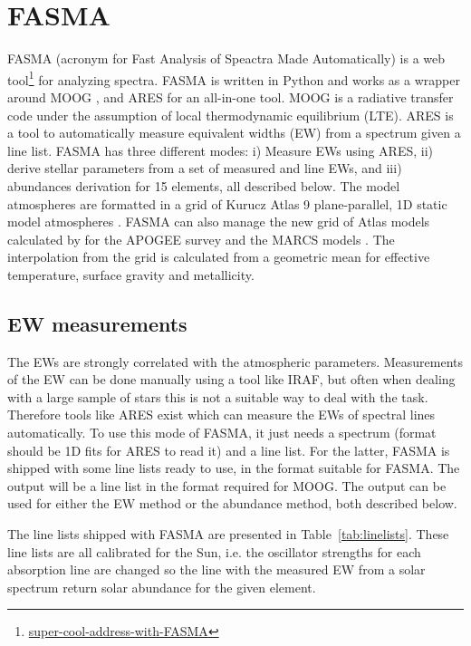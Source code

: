 \documentclass{aa}
\begin{document}
\section{FASMA}
\label{sec:FASMA}
FASMA (acronym for Fast Analysis of Speactra Made Automatically) is a web
tool\footnote{\url{super-cool-address-with-FASMA}} for analyzing spectra. FASMA
is written in Python and works as a wrapper around MOOG
\citep[][version 2014]{Sneden1973}, and ARES \citep{Sousa2015a} for an all-in-one
tool. MOOG is a radiative transfer code under the assumption of local
thermodynamic equilibrium (LTE). ARES is a tool to automatically measure
equivalent widths (EW) from a spectrum given a line list. FASMA has three
different modes: i) Measure EWs using ARES, ii) derive stellar parameters from a
set of measured  and  line EWs, and iii) abundances
derivation for 15 elements, all described below. The model atmospheres are
formatted in a grid of Kurucz Atlas 9 plane-parallel, 1D static model
atmospheres \citet{Kurucz1993}. FASMA can also manage the new grid of Atlas
models calculated by \citet{Meszaros2012} for the APOGEE survey and the MARCS
models \citep{Gustafson2008}. The interpolation from the grid is calculated from
a geometric mean for effective temperature, surface gravity and metallicity.



\subsection{EW measurements}
\label{sub:EW_measurements}
The EWs are strongly correlated with the atmospheric parameters. Measurements of
the EW can be done manually using a tool like IRAF, but often when dealing with
a large sample of stars this is not a suitable way to deal with the task.
Therefore tools like ARES exist which can measure the EWs of spectral lines
automatically. To use this mode of FASMA, it just needs a spectrum (format
should be 1D fits for ARES to read it) and a line list. For the latter, FASMA is
shipped with some line lists ready to use, in the format suitable for FASMA. The
output will be a line list in the format required for MOOG. The output can be
used for either the EW method or the abundance method, both described below.

The line lists shipped with FASMA are presented in Table~\ref{tab:linelists}.
These line lists are all calibrated for the Sun, i.e. the oscillator strengths
for each absorption line are changed so the line with the measured EW from a
solar spectrum return solar abundance for the given element.
\end{document}

